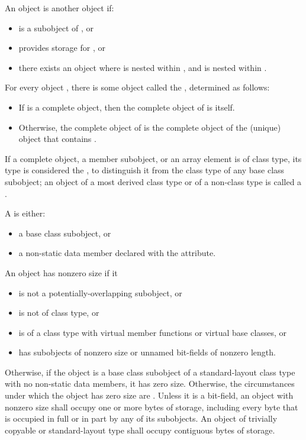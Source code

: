 \pnum
{}%
An object  is  another object  if:
\begin{itemize}
\item
{} is a subobject of , or
\item
{} provides storage for , or
\item
there exists an object 
where  is nested within ,
and  is nested within .
\end{itemize}

\pnum
For every object , there is some object called the
 , determined as follows:
\begin{itemize}
\item
If  is a complete object, then the complete object
of  is itself.

\item
Otherwise, the complete object of  is the complete object
of the (unique) object that contains .
\end{itemize}

\pnum
If a complete object, a member subobject, or an array element is of
class type, its type is considered the , to distinguish it from the class type of any base class subobject;
an object of a most derived class type or of a non-class type is called a
.

\pnum
A  is either:
\begin{itemize}
\item a base class subobject, or
\item a non-static data member
declared with the  attribute.
\end{itemize}

\pnum
{}%
%
An object has nonzero size if it
\begin{itemize}
\item is not a potentially-overlapping subobject, or
\item is not of class type, or
\item is of a class type with virtual member functions or virtual base classes, or
\item has subobjects of nonzero size or unnamed bit-fields of nonzero length.
\end{itemize}
Otherwise, if the object is a base class subobject
of a standard-layout class type
with no non-static data members,
it has zero size.
Otherwise, the circumstances under which the object has zero size
are .
%
Unless it is a bit-field,
an object with nonzero size
shall occupy one or more bytes of storage,
including every byte that is occupied in full or in part
by any of its subobjects.
An object of trivially copyable or
standard-layout type shall occupy contiguous bytes of
storage.

